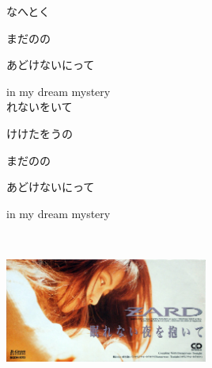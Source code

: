 {なへとく

まだのの

あどけないにって

in my dream mystery
\\

れないをいて

けけたをうの

まだのの

あどけないにって

in my dream mystery

}
{ \ }

\includegraphics[width=0.5\textwidth]{S4.jpg}